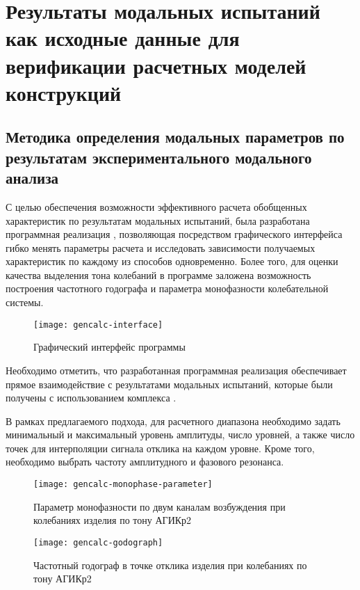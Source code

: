 \chapter{Результаты модальных испытаний как исходные данные для верификации расчетных моделей конструкций}

\section{Методика определения модальных параметров по результатам экспериментального модального анализа}

С целью обеспечения возможности эффективного расчета обобщенных характеристик по результатам модальных испытаний, была разработана программная реализация , позволяющая посредством графического интерфейса  гибко менять параметры расчета и исследовать зависимости получаемых характеристик по каждому из способов одновременно. Более того, для оценки качества выделения тона колебаний в программе заложена возможность построения частотного годографа  и параметра монофазности  колебательной системы.

\begin{figure}[!htb]
	\centerfloat
	\texttt{[image: gencalc-interface]}
	\caption{Графический интерфейс программы} \label{fig:gencalc-interface}
\end{figure}

Необходимо отметить, что разработанная программная реализация обеспечивает прямое взаимодействие с результатами модальных испытаний, которые были получены с использованием комплекса .

В рамках предлагаемого подхода, для расчетного диапазона необходимо задать минимальный и максимальный уровень амплитуды, число уровней, а также число точек для интерполяции сигнала отклика на каждом уровне. Кроме того, необходимо выбрать частоту амплитудного и фазового резонанса.

\begin{figure}[!htb]
	\centerfloat
	\texttt{[image: gencalc-monophase-parameter]}
	\caption{Параметр монофазности по двум каналам возбуждения при колебаниях изделия по тону АГИКр2} \label{fig:gencalc-monophase-parameter}
\end{figure}

\begin{figure}[!htb]
	\centerfloat
	\texttt{[image: gencalc-godograph]}
	\caption{Частотный годограф в точке отклика изделия при колебаниях по тону АГИКр2} \label{fig:gencalc-godograph}
\end{figure}

